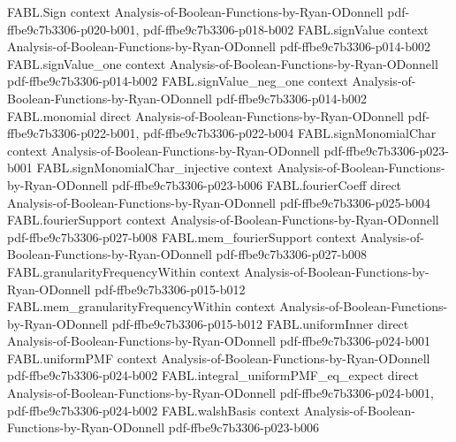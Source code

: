 \begin{theorem}
\label{FABL.productNoiseKernel_uniformSign}
\leanok
{}
\proofstep
  {FABL.Sign}
  {context}
  {Analysis-of-Boolean-Functions-by-Ryan-ODonnell}
  {pdf-ffbe9c7b3306-p020-b001,
    pdf-ffbe9c7b3306-p018-b002}
\proofstep
  {FABL.signValue}
  {context}
  {Analysis-of-Boolean-Functions-by-Ryan-ODonnell}
  {pdf-ffbe9c7b3306-p014-b002}
\proofstep
  {FABL.signValue_one}
  {context}
  {Analysis-of-Boolean-Functions-by-Ryan-ODonnell}
  {pdf-ffbe9c7b3306-p014-b002}
\proofstep
  {FABL.signValue_neg_one}
  {context}
  {Analysis-of-Boolean-Functions-by-Ryan-ODonnell}
  {pdf-ffbe9c7b3306-p014-b002}
\proofstep
  {FABL.monomial}
  {direct}
  {Analysis-of-Boolean-Functions-by-Ryan-ODonnell}
  {pdf-ffbe9c7b3306-p022-b001,
    pdf-ffbe9c7b3306-p022-b004}
\proofstep
  {FABL.signMonomialChar}
  {context}
  {Analysis-of-Boolean-Functions-by-Ryan-ODonnell}
  {pdf-ffbe9c7b3306-p023-b001}
\proofstep
  {FABL.signMonomialChar_injective}
  {context}
  {Analysis-of-Boolean-Functions-by-Ryan-ODonnell}
  {pdf-ffbe9c7b3306-p023-b006}
\proofstep
  {FABL.fourierCoeff}
  {direct}
  {Analysis-of-Boolean-Functions-by-Ryan-ODonnell}
  {pdf-ffbe9c7b3306-p025-b004}
\proofstep
  {FABL.fourierSupport}
  {context}
  {Analysis-of-Boolean-Functions-by-Ryan-ODonnell}
  {pdf-ffbe9c7b3306-p027-b008}
\proofstep
  {FABL.mem_fourierSupport}
  {context}
  {Analysis-of-Boolean-Functions-by-Ryan-ODonnell}
  {pdf-ffbe9c7b3306-p027-b008}
\proofstep
  {FABL.granularityFrequencyWithin}
  {context}
  {Analysis-of-Boolean-Functions-by-Ryan-ODonnell}
  {pdf-ffbe9c7b3306-p015-b012}
\proofstep
  {FABL.mem_granularityFrequencyWithin}
  {context}
  {Analysis-of-Boolean-Functions-by-Ryan-ODonnell}
  {pdf-ffbe9c7b3306-p015-b012}
\proofstep
  {FABL.uniformInner}
  {direct}
  {Analysis-of-Boolean-Functions-by-Ryan-ODonnell}
  {pdf-ffbe9c7b3306-p024-b001}
\proofstep
  {FABL.uniformPMF}
  {context}
  {Analysis-of-Boolean-Functions-by-Ryan-ODonnell}
  {pdf-ffbe9c7b3306-p024-b002}
\proofstep
  {FABL.integral_uniformPMF_eq_expect}
  {direct}
  {Analysis-of-Boolean-Functions-by-Ryan-ODonnell}
  {pdf-ffbe9c7b3306-p024-b001,
    pdf-ffbe9c7b3306-p024-b002}
\proofstep
  {FABL.walshBasis}
  {context}
  {Analysis-of-Boolean-Functions-by-Ryan-ODonnell}
  {pdf-ffbe9c7b3306-p023-b006}
\proofstep

\end{theorem}
